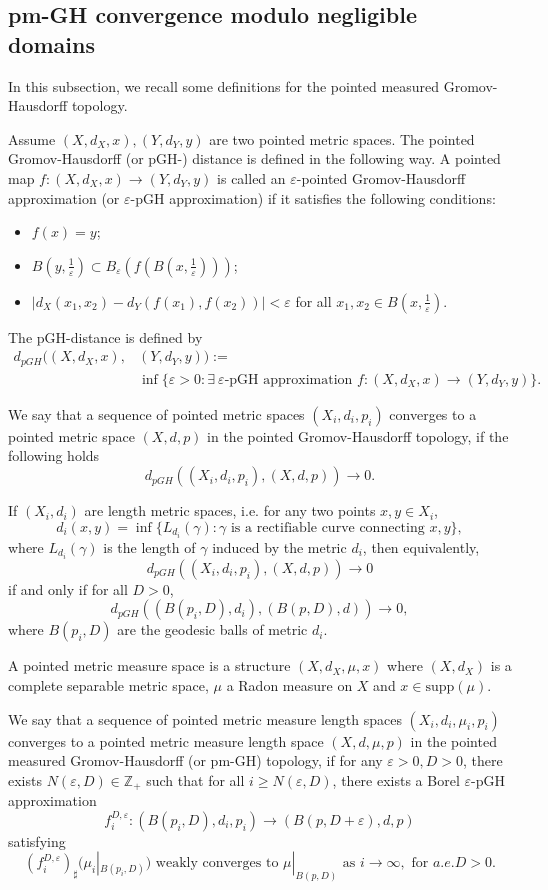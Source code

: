 \documentclass[letter]{amsart}
\theoremstyle{definition}
\theoremstyle{remark}
\begin{document}
\subsection{pm-GH convergence modulo negligible domains}
In this subsection, we recall some definitions for the pointed measured Gromov-Hausdorff topology.

Assume $(X,d_X,x), (Y,d_Y, y)$ are two pointed metric spaces.
The pointed Gromov-Hausdorff (or pGH-) distance is defined in the following way. A pointed map $f:(X,d_X,x)\to (Y, d_Y,y)$ is called an $\varepsilon $-pointed Gromov-Hausdorff approximation (or $\varepsilon $-pGH approximation) if it satisfies the following conditions:
\begin{itemize}
	\item[(1)] $f(x)=y$;
	\item [(2)] $B(y, \frac{1}{\varepsilon }) \subset B_\varepsilon (f(B(x, \frac{1}{\varepsilon })) )$;
	\item[(3)] $|d_X(x_1, x_2) - d_Y(f(x_1), f(x_2) )|<\varepsilon $ for all $x_1, x_2 \in B(x, \frac{1}{\varepsilon })$.
\end{itemize}
The pGH-distance is defined by
\begin{align*}
	d_{pGH}( (X,d_X, x), & (Y,d_Y,y) ) :=\\
&\inf \{\varepsilon>0 : \exists\ \varepsilon\text{-pGH approximation } f:(X,d_X,x)\to (Y,d_Y,y)\} .
\end{align*} 

We say that a sequence of pointed metric spaces $(X_i, d_i, p_i)$ converges to a pointed metric space $(X, d, p)$ in the pointed Gromov-Hausdorff topology, if the following holds 
$$d_{pGH}( (X_i, d_i, p_i), (X, d, p) ) \to 0.$$

If $(X_i, d_i)$ are length metric spaces, i.e.  for any two points $x, y \in X_i$, $$
d_i(x,y)= \inf \{L_{d_i}(\gamma ): \gamma \text{ is a rectifiable curve connecting }x, y\}, 
$$ where $L_{d_i}(\gamma )$ is the length of $\gamma $ induced by the metric $d_i$, then equivalently, 
$$d_{pGH}( (X_i, d_i, p_i), (X,d,p) )\to 0$$ 
if and only if for all $D>0$, $$d_{pGH}( (B(p_i, D), d_i), (B(p, D), d) ) \to 0,$$ where $B(p_i, D)$ are the geodesic balls of metric $d_i$.

A pointed metric measure space is a structure $(X,d_X, \mu, x )$ where $(X,d_X)$ is a complete separable metric space, $\mu $ a Radon measure on $X$ and $x \in \mathrm{supp} (\mu)$. 

We say that a sequence of pointed metric measure length spaces $(X_i, d_i, \mu _i, p_i)$ converges to a pointed metric measure length space $(X, d, \mu , p)$ in the pointed measured Gromov-Hausdorff (or pm-GH) topology, if for any $\varepsilon >0, D>0$, there exists $N(\varepsilon ,D) \in \mathbb{Z}_+$ such that for all $i \geq N(\varepsilon , D)$, there exists a Borel $\varepsilon $-pGH approximation 
$$f_i^{D, \varepsilon }: (B(p_i, D), d_i, p_i) \to (B(p, D+\varepsilon ), d, p) $$
satisfying 
$$
(f_i^{D, \varepsilon })_{\sharp}(\mu _i|_{B(p_i, D)}) \text{ weakly converges to } \mu |_{B(p, D)}  \text{ as } i\to \infty, \text{ for }a.e. D>0.
$$ 
\end{document}
